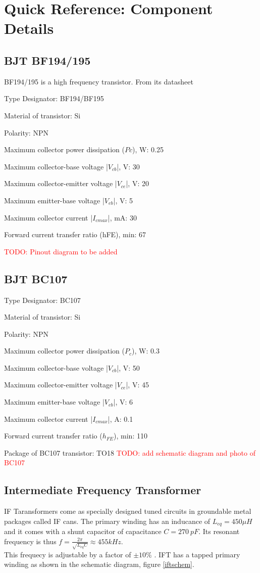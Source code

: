 \chapter {Quick Reference: Component Details}
\section{BJT BF194/195}
\label{BF194/195}
BF194/195 is a high frequency transistor. From its datasheet 

Type Designator: BF194/BF195

Material of transistor: Si

Polarity: NPN

Maximum collector power dissipation ($Pc$), W: 0.25

Maximum collector-base voltage |$V_{cb}$|, V: 30

Maximum collector-emitter voltage |$V_{ce}$|, V: 20

Maximum emitter-base voltage |$V_{eb}$|, V: 5

Maximum collector current |$I_{c max}$|, mA: 30

Forward current transfer ratio (hFE), min: 67

\textcolor{red}{TODO: Pinout diagram to be added}
\section{BJT BC107}
\label{BC107}
Type Designator: BC107

Material of transistor: Si

Polarity: NPN

Maximum collector power dissipation ($P_c$), W: 0.3

Maximum collector-base voltage |$V_{cb}$|, V: 50

Maximum collector-emitter voltage |$V_{ce}$|, V: 45

Maximum emitter-base voltage |$V_{eb}$|, V: 6

Maximum collector current |$I_{cmax}$|, A: 0.1

Forward current transfer ratio ($h_{FE}$), min: 110

Package of BC107 transistor: TO18
\textcolor{red}{TODO: add schematic diagram and photo of BC107}

\section{Intermediate Frequency Transformer}
\label{IFT}
IF Taransformers come as specially designed tuned circuits in groundable metal packages called IF cans. The primary winding has an inducance of $L_{eq}=450\mu H$ and it comes with a shunt capacitor of capacitance $C=270\ pF$. Its resonant frequency is thus $f=\frac{2\pi}{\sqrt{L_{eq}C}}\approx 455 kHz$.\\ This frequecy is adjustable by a factor of $\pm 10 \%$ . IFT has a tapped primary winding as shown in the schematic diagram, figure \ref{iftschem}. 

